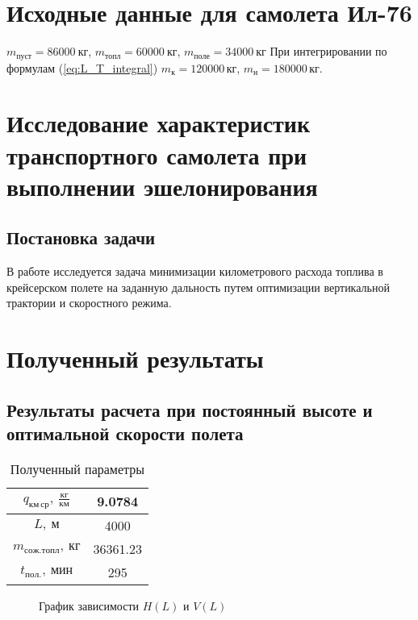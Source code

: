 \documentclass[bachelor,subf,14pt, substylefile = spbu.rtx]{disser}
\begin{document}
\section{Исходные данные для самолета Ил-76}
$m_{пуст} = 86000\ \text{кг}$, $m_{топл}= 60000\ \text{кг}$, $m_{поле}=34000\ \text{кг}$
При интегрировании по формулам (\ref{eq:L_T_integral}) $m_{к}=120000\, кг$, $m_{н}=180000\, кг$.

\section{Исследование характеристик транспортного самолета при выполнении эшелонирования}
\subsection{Постановка задачи}
В работе исследуется задача минимизации километрового расхода топлива в крейсерском полете на заданную дальность путем оптимизации вертикальной трактории и скоростного режима.  


%

\section{Полученный результаты}
\subsection{Результаты расчета при постоянный высоте и оптимальной скорости полета}

\begin{table}[H]
    \centering
    \caption{Полученный параметры}
    \label{tab:table_H_const_V_diff}
    \begin{tabular}{|c|c|}
        \hline
        $q_{км\, ср},\ \frac{кг}{км}$ & 9.0784 \\
        \hline
        $L,\ м$ & 4000 \\
        \hline
        $m_{сож.топл},\ кг$ & 36361.23 \\
        \hline
        $t_{пол.},\ мин$ & 295 \\
        \hline
    \end{tabular}
\end{table}



\begin{figure}[H]
\centering

\caption{График зависимости $H(L)$ и $V(L)$}
\label{fig:H_const_V_diff_L_H_V}
\end{figure}
\end{document}
